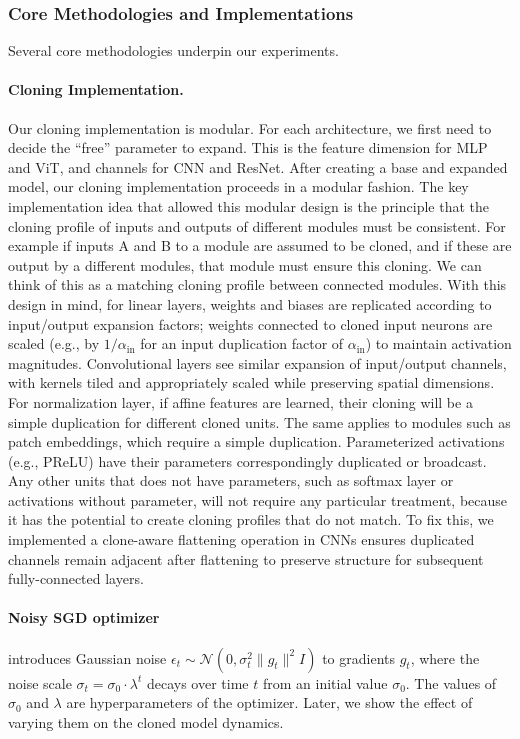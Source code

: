 \documentclass{article}
\numberwithin{figure}{section}
\begin{document}
\subsubsection{Core Methodologies and Implementations}
\label{subsec:core_methodologies}

Several core methodologies underpin our experiments.


\paragraph{Cloning Implementation.}  Our cloning implementation is modular. For each architecture, we first need to decide the ``free'' parameter to expand. This is the feature dimension for MLP and ViT, and channels for CNN and ResNet. After creating a base and expanded model, our cloning implementation proceeds in a modular fashion. The key implementation idea that allowed this modular design is the principle that the cloning profile of inputs and outputs of different modules must be consistent. For example if inputs A and B to a module are assumed to be cloned, and if these are output by a different modules, that module must ensure this cloning. We can think of this as a matching cloning profile between connected modules. With this design in mind, for linear layers, weights and biases are replicated according to input/output expansion factors; weights connected to cloned input neurons are scaled (e.g., by $1/\alpha_{\text{in}}$ for an input duplication factor of $\alpha_{\text{in}}$) to maintain activation magnitudes. Convolutional layers see similar expansion of input/output channels, with kernels tiled and appropriately scaled while preserving spatial dimensions. For normalization layer, if affine features are learned, their cloning will be a simple duplication for different cloned units. The same applies to modules such as patch embeddings, which require a simple duplication.  Parameterized activations (e.g., PReLU) have their parameters correspondingly duplicated or broadcast. Any other units that does not have parameters, such as softmax layer or activations without parameter, will not require any particular treatment, because it has the potential to create cloning profiles that do not match.  
To fix this, we implemented a clone-aware flattening operation in CNNs ensures duplicated channels remain adjacent after flattening to preserve structure for subsequent fully-connected layers.

\paragraph{Noisy SGD optimizer} introduces Gaussian noise $\epsilon_t \sim \mathcal{N}(0, \sigma_t^2 \|g_t\|^2 I)$ to gradients $g_t$, where the noise scale $\sigma_t = \sigma_0 \cdot \lambda^t$ decays over time $t$ from an initial value $\sigma_0$. The values of $\sigma_0$ and $\lambda$ are hyperparameters of the optimizer. Later, we show the effect of varying them on the cloned model dynamics.
 
\end{document}
